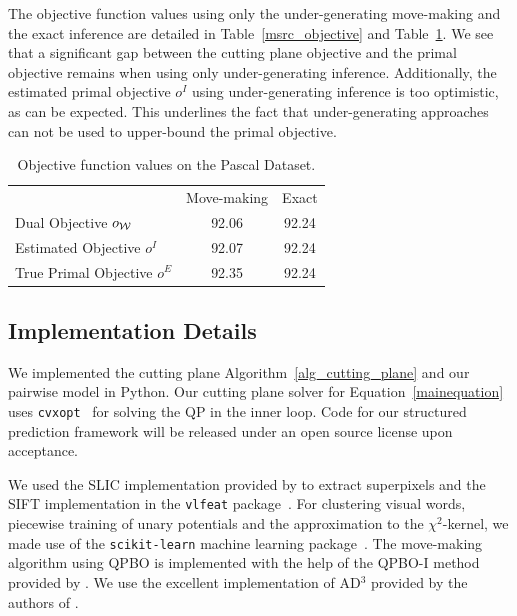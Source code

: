 The objective function values using only the under-generating move-making and
the exact inference are detailed in Table~\ref{msrc_objective} and Table~\ref{pascal_objective}.
We see that a significant gap between the cutting plane objective and the primal objective
remains when using only under-generating inference.
Additionally, the estimated primal objective $o^I$ using under-generating inference is
too optimistic, as can be expected. This underlines the fact that
under-generating approaches can not be used to upper-bound the primal
objective.

\begin{table}
    \begin{center}
    \begin{tabularx}{\linewidth}{@{\extracolsep{\fill}}lcc}
    \toprule
                    & Move-making & Exact \\
    \cmidrule{1-3}
    Dual Objective $o_{\mathcal{W}}$ &92.06& 92.24\\
    Estimated Objective $o^I$ & 92.07 &92.24\\
    True Primal Objective $o^E$&92.35& 92.24  \\
    \bottomrule
    \end{tabularx}
    \end{center}
    \caption{Objective function values on the Pascal Dataset.}
    \label{pascal_objective}
\end{table}


\subsection{Implementation Details}
We implemented the cutting plane Algorithm~\ref{alg_cutting_plane} and our pairwise
model in Python.
Our cutting plane solver for Equation~\eqref{mainequation} uses
\texttt{cvxopt}~\citep{dahl2006cvxopt} for solving the QP in the inner loop. Code for
our structured prediction framework will be released under an open source
license upon acceptance.

We used the SLIC implementation provided by \citet{achanta2012slic} to extract superpixels and
the SIFT implementation in the \texttt{vlfeat} package~\citep{vedaldi08vlfeat}.
For clustering visual words, piecewise training of unary potentials and the
approximation to the $\chi^2$-kernel, we made use of the \texttt{scikit-learn}
machine learning package~\citep{pedregosa2011scikit}.
The move-making algorithm using QPBO is implemented with the help of the QPBO-I
method provided by \citet{rother2007optimizing}.
We use the excellent implementation of AD$^3$ provided by the authors of
\citet{martins2011augmented}. 

